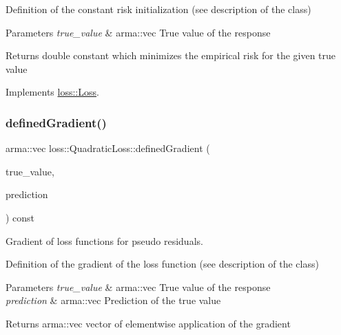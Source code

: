 Definition of the constant risk initialization (see description of the class)


\begin{DoxyParams}{Parameters}
{\em true\+\_\+value} & {\ttfamily arma\+::vec} True value of the response\\
\hline
\end{DoxyParams}
\begin{DoxyReturn}{Returns}
{\ttfamily double} constant which minimizes the empirical risk for the given true value 
\end{DoxyReturn}


Implements \hyperlink{classloss_1_1_loss_a65fe7dcd9370e6a549b8d1cc95fc8798}{loss\+::\+Loss}.

\mbox{\label{classloss_1_1_quadratic_loss_adb4da1acbad702b5ba8570abaa17d373}} 
\subsubsection{\texorpdfstring{defined\+Gradient()}{definedGradient()}}
{\footnotesize\ttfamily arma\+::vec loss\+::\+Quadratic\+Loss\+::defined\+Gradient (\begin{DoxyParamCaption}\item[{const arma\+::vec \&}]{true\+\_\+value,  }\item[{const arma\+::vec \&}]{prediction }\end{DoxyParamCaption}) const\hspace{0.3cm}{\ttfamily [virtual]}}



Gradient of loss functions for pseudo residuals. 

Definition of the gradient of the loss function (see description of the class)


\begin{DoxyParams}{Parameters}
{\em true\+\_\+value} & {\ttfamily arma\+::vec} True value of the response \\
\hline
{\em prediction} & {\ttfamily arma\+::vec} Prediction of the true value\\
\hline
\end{DoxyParams}
\begin{DoxyReturn}{Returns}
{\ttfamily arma\+::vec} vector of elementwise application of the gradient 
\end{DoxyReturn}


